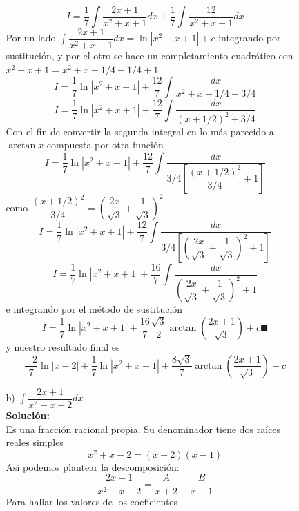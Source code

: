 \documentclass[10pt,twoside]{SelfArx} %
\begin{document}
\begin{enumerate}
\begin{enumerate}
\begin{enumerate}
\begin{equation}
I=\dfrac{1}{7}\int\dfrac{2x+1}{x^{2}+x+1}dx+\dfrac{1}{7}\int\dfrac{12}{x^{2}+x+1}dx
\end{equation}
Por un lado $ \int\dfrac{2x+1}{x^{2}+x+1}dx=\ln|x^{2}+x+1|+c $ integrando por sustituci\'on, y por el otro se hace un completamiento cuadr\'atico con $ x^{2}+x+1=x^{2}+x+1/4-1/4+1 $
\begin{equation}
I=\dfrac{1}{7}\ln|x^{2}+x+1|+\dfrac{12}{7}\int\dfrac{dx}{x^{2}+x+1/4+3/4}
\end{equation}
\begin{equation}
I=\dfrac{1}{7}\ln|x^{2}+x+1|+\dfrac{12}{7}\int\dfrac{dx}{(x+1/2)^{2}+3/4}
\end{equation}
Con el fin de convertir la segunda integral en lo más parecido a $ \arctan x $ compuesta por otra funci\'on
\begin{equation}
I=\dfrac{1}{7}\ln|x^{2}+x+1|+\dfrac{12}{7}\int\dfrac{dx}{3/4\left [\dfrac{(x+1/2)^{2}}{3/4}+1\right ]}
\end{equation}
como $ \dfrac{(x+1/2)^{2}}{3/4}=\left (\dfrac{2x}{\sqrt{3}}+\dfrac{1}{\sqrt{3}}\right )^{2} $
\begin{equation}
I=\dfrac{1}{7}\ln|x^{2}+x+1|+\dfrac{12}{7}\int\dfrac{dx}{3/4\left [\left (\dfrac{2x}{\sqrt{3}}+\dfrac{1}{\sqrt{3}}\right )^{2}+1\right ]}
\end{equation}
\begin{equation}
I=\dfrac{1}{7}\ln|x^{2}+x+1|+\dfrac{16}{7}\int\dfrac{dx}{\left (\dfrac{2x}{\sqrt{3}}+\dfrac{1}{\sqrt{3}}\right )^{2}+1}
\end{equation}
e integrando por el método de sustitución
\begin{equation}
I=\dfrac{1}{7}\ln|x^{2}+x+1|+\dfrac{16}{7}\frac{\sqrt{3}}{2}\arctan \left (\dfrac{2x+1}{\sqrt{3}}\right )+c\blacksquare
\end{equation}
y nuestro resultado final es 
\begin{equation}
\dfrac{-2}{7}\ln|x-2|+\dfrac{1}{7}\ln|x^{2}+x+1|+\dfrac{8\sqrt{3}}{7}\arctan\left  (\dfrac{2x+1}{\sqrt{3}}\right )+c
\end{equation}
\item [b)]$ \displaystyle\int \dfrac{2x+1}{x^{2}+x-2}dx $\\
\textbf{Solución:}\\
Es una fracción  racional propia. Su denominador tiene dos raíces reales simples
\[ x^{2}+x-2=(x+2)(x-1) \]
Así podemos plantear la descomposición:
\[ \dfrac{2x+1}{x^{2}+x-2}=\dfrac{A}{x+2}+\dfrac{B}{x-1} \]
Para hallar los valores de los coeficientes

\end{enumerate}
\end{enumerate}
\end{enumerate}
\end{document}

